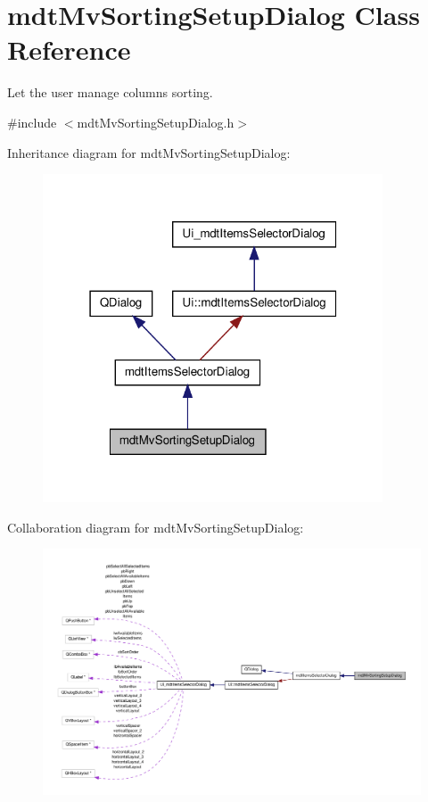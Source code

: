 \hypertarget{classmdt_mv_sorting_setup_dialog}{\section{mdt\-Mv\-Sorting\-Setup\-Dialog Class Reference}
\label{classmdt_mv_sorting_setup_dialog}
}


Let the user manage columns sorting.  




{\ttfamily \#include $<$mdt\-Mv\-Sorting\-Setup\-Dialog.\-h$>$}



Inheritance diagram for mdt\-Mv\-Sorting\-Setup\-Dialog\-:\nopagebreak
\begin{figure}[H]
\begin{center}
\leavevmode
\includegraphics[width=286pt]{classmdt_mv_sorting_setup_dialog__inherit__graph}
\end{center}
\end{figure}


Collaboration diagram for mdt\-Mv\-Sorting\-Setup\-Dialog\-:\nopagebreak
\begin{figure}[H]
\begin{center}
\leavevmode
\includegraphics[width=350pt]{classmdt_mv_sorting_setup_dialog__coll__graph}
\end{center}
\end{figure}

